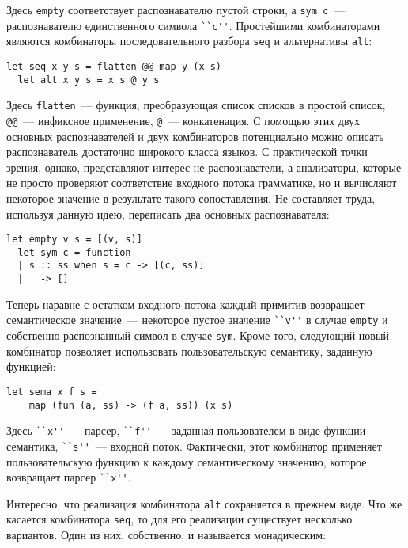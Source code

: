 \documentclass[conference]{IEEEtran}
\begin{document}
Здесь \lstinline|empty| соответствует распознавателю пустой строки, а \lstinline|sym с|~--- распознавателю единственного символа \lstinline|``c''|. Простейшими комбинаторами
являются комбинаторы последовательного разбора \lstinline|seq| и альтернативы \lstinline|alt|:

\begin{lstlisting}[basicstyle=\small]
  let seq x y s = flatten @@ map y (x s)
  let alt x y s = x s @ y s
\end{lstlisting}

Здесь \lstinline|flatten|~--- функция, преобразующая список списков в простой список, \lstinline|@@|~--- инфиксное применение, \lstinline|@|~--- конкатенация. С помощью
этих двух основных распознавателей и двух комбинаторов потенциально можно описать распознаватель достаточно широкого класса языков. С практической точки зрения, однако,
представляют интерес не распознаватели, а анализаторы, которые не просто проверяют соответствие входного потока грамматике, но и вычисляют некоторое значение в результате
такого сопоставления. Не составляет труда, используя данную идею, переписать два основных распознавателя:

\begin{lstlisting}[basicstyle=\small]
  let empty v s = [(v, s)]
  let sym c = function
  | s :: ss when s = c -> [(c, ss)]
  | _ -> []
\end{lstlisting}

Теперь наравне с остатком входного потока каждый примитив возвращает семантическое значение~--- некоторое пустое значение \lstinline|``v''| в случае \lstinline|empty| и собственно распознанный
символ в случае \lstinline|sym|. Кроме того, следующий новый комбинатор позволяет использовать пользовательскую семантику, заданную функцией:

\begin{lstlisting}[basicstyle=\small]
  let sema x f s =
    map (fun (a, ss) -> (f a, ss)) (x s)
\end{lstlisting}

Здесь \lstinline|``x''|~--- парсер, \lstinline|``f''|~--- заданная пользователем в виде функции семантика, \lstinline|``s''|~--- входной поток. Фактически, этот комбинатор
применяет пользовательскую функцию к каждому семантическому значению, которое возвращает парсер \lstinline|``x''|.

Интересно, что реализация комбинатора \lstinline|alt| сохраняется в прежнем виде. Что же касается комбинатора \lstinline|seq|, то для его реализации существует несколько
вариантов. Один из них, собственно, и называется монадическим:
\end{document}
